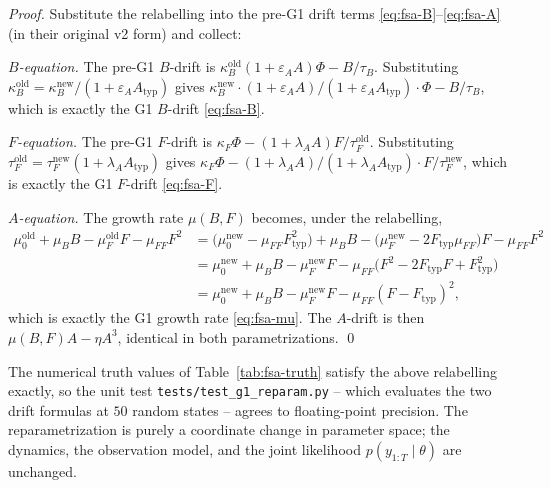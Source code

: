 \begin{proof}
Substitute the relabelling into the pre-G1 drift terms
\eqref{eq:fsa-B}--\eqref{eq:fsa-A} (in their original v2 form) and
collect:

\emph{$B$-equation.} The pre-G1 $B$-drift is
$\kappa_B^{\mathrm{old}}(1+\varepsilon_A A)\Phi - B/\tau_B$.
Substituting
$\kappa_B^{\mathrm{old}} = \kappa_B^{\mathrm{new}}/(1+\varepsilon_A A_{\mathrm{typ}})$
gives
$\kappa_B^{\mathrm{new}} \cdot (1+\varepsilon_A A)/(1+\varepsilon_A A_{\mathrm{typ}}) \cdot \Phi - B/\tau_B$,
which is exactly the G1 $B$-drift \eqref{eq:fsa-B}.

\emph{$F$-equation.} The pre-G1 $F$-drift is
$\kappa_F\Phi - (1+\lambda_A A) F/\tau_F^{\mathrm{old}}$. Substituting
$\tau_F^{\mathrm{old}} = \tau_F^{\mathrm{new}}(1+\lambda_A A_{\mathrm{typ}})$
gives
$\kappa_F\Phi - (1+\lambda_A A)/(1+\lambda_A A_{\mathrm{typ}}) \cdot F/\tau_F^{\mathrm{new}}$,
which is exactly the G1 $F$-drift \eqref{eq:fsa-F}.

\emph{$A$-equation.} The growth rate $\mu(B,F)$ becomes, under the
relabelling,
\begin{align*}
  \mu_0^{\mathrm{old}} + \mu_B B - \mu_F^{\mathrm{old}} F - \mu_{FF} F^2
  &= \bigl(\mu_0^{\mathrm{new}} - \mu_{FF} F_{\mathrm{typ}}^2\bigr) + \mu_B B
     - \bigl(\mu_F^{\mathrm{new}} - 2 F_{\mathrm{typ}} \mu_{FF}\bigr) F - \mu_{FF} F^2 \\
  &= \mu_0^{\mathrm{new}} + \mu_B B - \mu_F^{\mathrm{new}} F
     - \mu_{FF}\bigl(F^2 - 2 F_{\mathrm{typ}} F + F_{\mathrm{typ}}^2\bigr) \\
  &= \mu_0^{\mathrm{new}} + \mu_B B - \mu_F^{\mathrm{new}} F
     - \mu_{FF}(F - F_{\mathrm{typ}})^2,
\end{align*}
which is exactly the G1 growth rate \eqref{eq:fsa-mu}. The $A$-drift
is then $\mu(B,F) A - \eta A^3$, identical in both
parametrizations. \qed
\end{proof}

The numerical truth values of Table~\ref{tab:fsa-truth} satisfy the
above relabelling exactly, so the unit test
\texttt{tests/test\_g1\_reparam.py} -- which evaluates the two
drift formulas at $50$ random states -- agrees to floating-point
precision. The reparametrization is purely a coordinate change in
parameter space; the dynamics, the observation model, and the joint
likelihood $p(y_{1:T} \mid \theta)$ are unchanged.
